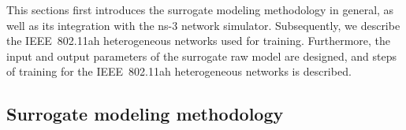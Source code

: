 




This sections first introduces the surrogate modeling methodology in general, as well as its integration with the ns-3 network simulator. Subsequently, we describe the IEEE~802.11ah heterogeneous networks used for training. Furthermore, the input and output parameters of the surrogate \gls{raw} model are designed, and steps of training for  the IEEE~802.11ah heterogeneous networks is described. 


\subsection{Surrogate modeling methodology}


